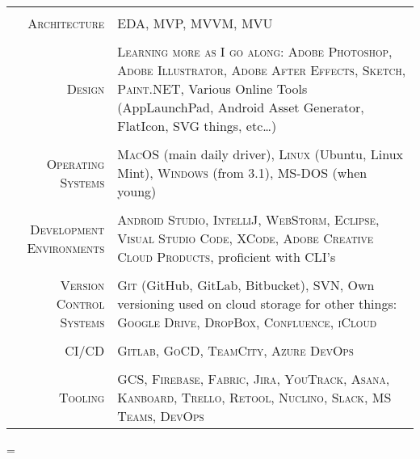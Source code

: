 \documentclass[a4paper,10pt,notitlepage]{article}
\newenvironment{absolutelynopagebreak}
  {\par\nobreak\vfil\penalty0\vfilneg
   \vtop\bgroup}
  {\par\xdef\tpd{\the\prevdepth}\egroup
   \prevdepth=\tpd}
\begin{document}
\begin{absolutelynopagebreak}
\begin{tabular}{r|p{11cm}}
		\multicolumn{2}{c}{}\\
		
		\textsc{Architecture}             & \textsc{EDA, MVP, MVVM, MVU} \\
		
		\multicolumn{2}{c}{}\\
		
		\textsc{Design}                   & \textsc{Learning more as I go along}: \textsc{Adobe Photoshop}, \textsc{Adobe Illustrator}, \textsc{Adobe After Effects}, \textsc{Sketch}, \textsc{Paint.NET}, Various Online Tools (AppLaunchPad, Android Asset Generator, FlatIcon, SVG things, etc\ldots) \\
		
		\multicolumn{2}{c}{}\\
		
		\textsc{Operating Systems}        & \textsc{MacOS} (main daily driver), \textsc{Linux} (Ubuntu, Linux Mint), \textsc{Windows} (from 3.1), \textsc{MS-DOS} (when young) \\
		 
		\multicolumn{2}{c}{} \\
		 
		\textsc{Development Environments} & \textsc{Android Studio}, \textsc{IntelliJ}, \textsc{WebStorm}, \textsc{Eclipse}, \textsc{Visual Studio Code}, \textsc{XCode}, \textsc{Adobe Creative Cloud Products}, proficient with CLI's \\
		 
		\multicolumn{2}{c}{} \\
		 
		\textsc{Version Control Systems}  & \textsc{Git} (GitHub, GitLab, Bitbucket), \textsc{SVN}, Own versioning used on cloud storage for other things: \textsc{Google Drive}, \textsc{DropBox}, \textsc{Confluence}, \textsc{iCloud} \\
		
		\multicolumn{2}{c}{} \\
		
		\textsc{CI/CD}  & \textsc{Gitlab}, \textsc{GoCD}, \textsc{TeamCity}, \textsc{Azure DevOps} \\
		
		\multicolumn{2}{c}{} \\
		
		\textsc{Tooling}  & \textsc{GCS}, \textsc{Firebase}, \textsc{Fabric}, \textsc{Jira}, \textsc{YouTrack}, \textsc{Asana}, \textsc{Kanboard}, \textsc{Trello}, \textsc{Retool}, \textsc{Nuclino}, \textsc{Slack}, \textsc{MS Teams}, \textsc{DevOps} \\ 
		 
	\end{tabular}
	
\end{absolutelynopagebreak}
	
	
\end{document}
